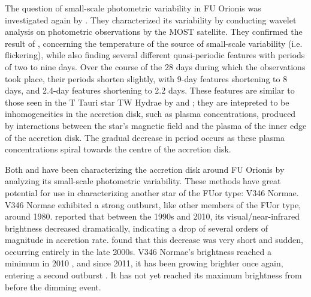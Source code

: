 \documentclass[iop,apj,tighten]{emulateapj}
\begin{document}
The question of small-scale photometric variability in FU Orionis was investigated again by \cite{siwak_photometric_2013}. They characterized its variability by conducting wavelet analysis on photometric observations by the MOST satellite. They confirmed the result of \cite{kenyon_flickering_2000}, concerning the temperature of the source of small-scale variability (i.e. flickering), while also finding several different quasi-periodic features with periods of two to nine days. Over the course of the 28 days during which the observations took place, their periods shorten slightly, with 9-day features shortening to 8 days, and 2.4-day features shortening to 2.2 days. These features are similar to those seen in the T Tauri star TW Hydrae by \cite{rucinski_photometric_2008} and \cite{siwak_analysis_2011}; they are intepreted to be inhomogeneities in the accretion disk, such as plasma concentrations, produced by interactions between the star's magnetic field and the plasma of the inner edge of the accretion disk. The gradual decrease in period occurs as these plasma concentrations spiral towards the centre of the accretion disk.

Both \cite{kenyon_flickering_2000} and \cite{siwak_photometric_2013} have been characterizing the accretion disk around FU Orionis by analyzing its small-scale photometric variability. These methods have great potential for use in characterizing another star of the FUor type: V346 Normae. V346 Normae exhibited a strong outburst, like other members of the FUor type, around 1980. \cite{kraus_v346_2016} reported that between the 1990s and 2010, its visual/near-infrared brightness decreased dramatically, indicating a drop of several orders of magnitude in accretion rate. \cite{kospal2017brightness} found that this decrease was very short and sudden, occurring entirely in the late 2000s. V346 Normae's brightness reached a minimum in 2010 \citep{kospal2017brightness}, and since 2011, it has been growing brighter once again, entering a second outburst \citep{kraus_v346_2016}. It has not yet reached its maximum brightness from before the dimming event.
\end{document}
